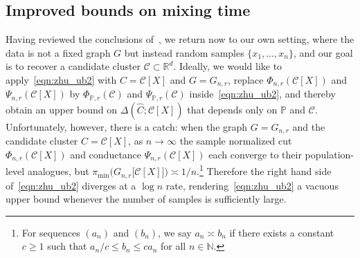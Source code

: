 \documentclass[11pt,twoside]{article}
\newcommand{\Reals}{\mathbb{R}}
\newcommand{\1}{\mathbf{1}}
\newcommand{\Rd}{\Reals^d}
\newcommand{\mc}[1]{\mathcal{#1}}
\newcommand{\Pbb}{\mathbb{P}}
\newcommand{\wh}[1]{\widehat{#1}}
\begin{document}
\subsection{Improved bounds on mixing time} 
\label{subsec:mixing_time}
Having reviewed the conclusions of~\cite{zhu2013}, we return now to our own setting, where the data is not a fixed graph $G$ but instead random samples $\{x_1,\ldots,x_n\}$, and our goal is to recover a candidate cluster $\mc{C} \subset \Rd$. Ideally, we would like to apply~\eqref{eqn:zhu_ub2} with $C = \mc{C}[X]$ and $G = G_{n,r}$, replace $\Phi_{n,r}(\mc{C}[X])$ and $\Psi_{n,r}(\mc{C}[X])$ by $\Phi_{\Pbb,r}(\mc{C})$ and $\Psi_{\Pbb,r}(\mc{C})$ inside~\eqref{eqn:zhu_ub2}, and thereby obtain an upper bound on $\Delta(\wh{C};\mc{C}[X])$ that depends only on $\Pbb$ and $\mc{C}$. Unfortunately, however, there is a catch: when the graph $G = G_{n,r}$ and the candidate cluster $C = \mc{C}[X]$, as $n \to \infty$ the sample normalized cut $\Phi_{n,r}(\mc{C}[X])$ and conductance $\Psi_{n,r}(\mc{C}[X])$ each converge to their population-level analogues, but $\pi_{\min}\bigl(G_{n,r}\bigl[\mc{C}[X]\bigr]\bigr) \asymp 1/n$.\footnote{For sequences $(a_n)$ and $(b_n)$, we say $a_n \asymp b_n$ if there exists a constant $c \geq 1$ such that $a_n/c \leq b_n \leq c a_n$ for all $n \in \mathbb{N}$.} Therefore the right hand side of~\eqref{eqn:zhu_ub2} diverges at a $\log n$ rate, rendering~\eqref{eqn:zhu_ub2} a vacuous upper bound whenever the number of samples is sufficiently large.
\end{document}
